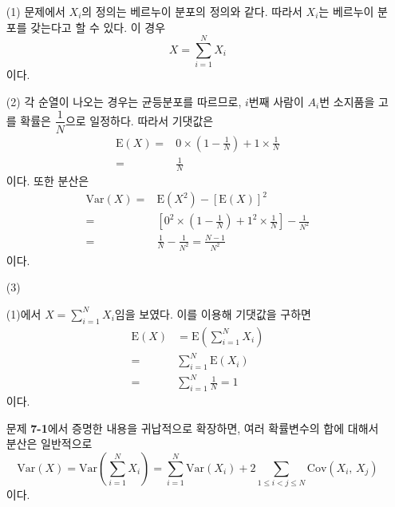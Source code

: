 \begin{itemize}
	\item [(1)] {
		문제에서 $X_i$의 정의는 베르누이 분포의 정의와 같다. 따라서 $X_i$는 베르누이 분포를 갖는다고 할 수 있다. 이 경우 \[X = \sum_{i = 1}^{N} X_i\]이다.
	}
	\item [(2)] {
		각 순열이 나오는 경우는 균등분포를 따르므로, $i$번째 사람이 $A_i$번 소지품을 고를 확률은 $\dfrac{1}{N}$으로 일정하다. 따라서 기댓값은
		\begin{align*}
			\mathrm{E}\left(X\right) =& 0 \times \left(1 - \frac{1}{N}\right) + 1 \times \frac{1}{N}\\
			=& \frac{1}{N}
		\end{align*}
		이다. 또한 분산은
		\begin{align*}
			\mathrm{Var}\left(X\right) =& \mathrm{E}\left(X^2\right) - \left[\mathrm{E}\left(X\right)\right]^2 \\
			=& \left[0^2 \times \left(1 - \frac{1}{N}\right) + 1^2 \times \frac{1}{N}\right] - \frac{1}{N^2} \\
			=& \frac{1}{N} - \frac{1}{N^2} = \frac{N - 1}{N^2}
		\end{align*}
		이다.
	}
	\item [(3)] {
		(1)에서 $X = \sum_{i = 1}^{N} X_i$임을 보였다. 이를 이용해 기댓값을 구하면
		\begin{align*}
			\mathrm{E}\left(X\right) &= \mathrm{E}\left(\sum_{i = 1}^{N} X_i\right) \\
			=& \sum_{i = 1}^{N} \mathrm{E}\left(X_i\right) \\
			=& \sum_{i = 1}^{N} \frac{1}{N} = 1
		\end{align*}
		이다.

		문제 \textbf{7-1}에서 증명한 내용을 귀납적으로 확장하면, 여러 확률변수의 합에 대해서 분산은 일반적으로
		\[\mathrm{Var}\left(X\right) = \mathrm{Var}\left(\sum_{i = 1}^{N} X_i\right) = \sum_{i = 1}^{N}\mathrm{Var}\left(X_i\right) + 2\sum_{1 \leq i < j \leq N}\mathrm{Cov}\left(X_i,\,X_j\right)\]
		이다.
		
}
\end{itemize}
